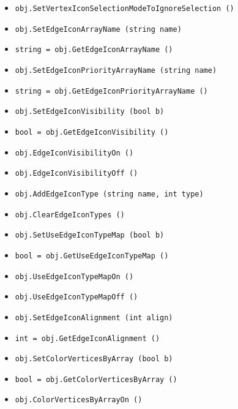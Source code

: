 \begin{itemize}
\item  \verb|obj.SetVertexIconSelectionModeToIgnoreSelection ()|

\item  \verb|obj.SetEdgeIconArrayName (string name)|

\item  \verb|string = obj.GetEdgeIconArrayName ()|

\item  \verb|obj.SetEdgeIconPriorityArrayName (string name)|

\item  \verb|string = obj.GetEdgeIconPriorityArrayName ()|

\item  \verb|obj.SetEdgeIconVisibility (bool b)|

\item  \verb|bool = obj.GetEdgeIconVisibility ()|

\item  \verb|obj.EdgeIconVisibilityOn ()|

\item  \verb|obj.EdgeIconVisibilityOff ()|

\item  \verb|obj.AddEdgeIconType (string name, int type)|

\item  \verb|obj.ClearEdgeIconTypes ()|

\item  \verb|obj.SetUseEdgeIconTypeMap (bool b)|

\item  \verb|bool = obj.GetUseEdgeIconTypeMap ()|

\item  \verb|obj.UseEdgeIconTypeMapOn ()|

\item  \verb|obj.UseEdgeIconTypeMapOff ()|

\item  \verb|obj.SetEdgeIconAlignment (int align)|

\item  \verb|int = obj.GetEdgeIconAlignment ()|

\item  \verb|obj.SetColorVerticesByArray (bool b)|

\item  \verb|bool = obj.GetColorVerticesByArray ()|

\item  \verb|obj.ColorVerticesByArrayOn ()|


\end{itemize}
